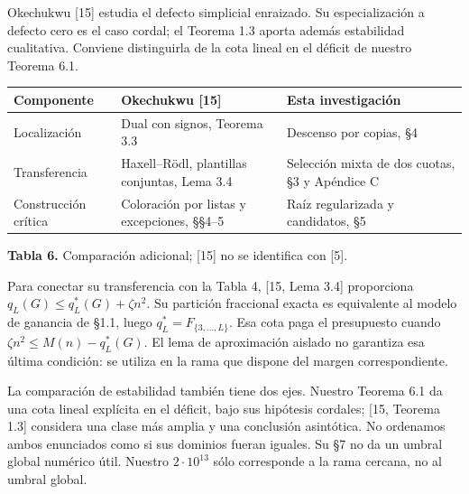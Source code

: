 \documentclass[spanish,11pt,a4paper]{article}
\newcounter{none}
\begin{document}
Okechukwu {[}15{]} estudia el defecto simplicial enraizado. Su especialización a defecto cero es el caso cordal; el Teorema 1.3 aporta además estabilidad cualitativa. Conviene distinguirla de la cota lineal en el déficit de nuestro Teorema 6.1.


{\def\LTcaptype{none} %
\begin{longtable}[c]{@{}
  >{\raggedright\arraybackslash}p{}
  >{\raggedright\arraybackslash}p{}
  >{\raggedright\arraybackslash}p{}@{}}
\toprule\noalign{}
\begin{minipage}[b]{\linewidth}\raggedright
Componente
\end{minipage} & \begin{minipage}[b]{\linewidth}\raggedright
Okechukwu {[}15{]}
\end{minipage} & \begin{minipage}[b]{\linewidth}\raggedright
Esta investigación
\end{minipage} \\
\midrule\noalign{}
\endhead
\bottomrule\noalign{}
\endlastfoot
Localización & Dual con signos, Teorema 3.3 & Descenso por copias, §4 \\
Transferencia & Haxell--Rödl, plantillas conjuntas, Lema 3.4 & Selección mixta de dos cuotas, §3 y Apéndice C \\
Construcción crítica & Coloración por listas y excepciones, §§4--5 & Raíz regularizada y candidatos, §5 \\
\end{longtable}
}

\textbf{Tabla 6.} Comparación adicional; {[}15{]} no se identifica con {[}5{]}.

Para conectar su transferencia con la Tabla 4, {[}15, Lema 3.4{]} proporciona \(q_L(G)\le q_L^*(G)+\zeta n^2\). Su partición fraccional exacta es equivalente al modelo de ganancia de §1.1, luego \(q_L^*=F_{\{3,\ldots,L\}}\). Esa cota paga el presupuesto cuando \(\zeta n^2\le M(n)-q_L^*(G)\). El lema de aproximación aislado no garantiza esa última condición: se utiliza en la rama que dispone del margen correspondiente.

La comparación de estabilidad también tiene dos ejes. Nuestro Teorema 6.1 da una cota lineal explícita en el déficit, bajo sus hipótesis cordales; {[}15, Teorema 1.3{]} considera una clase más amplia y una conclusión asintótica. No ordenamos ambos enunciados como si sus dominios fueran iguales. Su §7 no da un umbral global numérico útil. Nuestro \(2\cdot10^{13}\) sólo corresponde a la rama cercana, no al umbral global.
\end{document}
